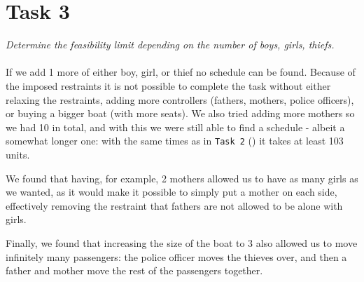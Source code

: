 \section{Task 3}
\label{sec:task3}
\textit{Determine the feasibility limit depending on the number of boys, girls, thiefs.}\\\\
If we add 1 more of either boy, girl, or thief no schedule can be found. Because of the imposed restraints it is not possible to complete the task without either relaxing the restraints, adding more controllers (fathers, mothers, police officers), or buying a bigger boat (with more seats). We also tried adding more mothers so we had 10 in total, and with this we were still able to find a schedule - albeit a somewhat longer one: with the same times as in \texttt{Task 2} () it takes at least 103 units.

We found that having, for example, 2 mothers allowed us to have as many girls as we wanted, as it would make it possible to simply put a mother on each side, effectively removing the restraint that fathers are not allowed to be alone with girls.

Finally, we found that increasing the size of the boat to 3 also allowed us to move infinitely many passengers: the police officer moves the thieves over, and then a father and mother move the rest of the passengers together.